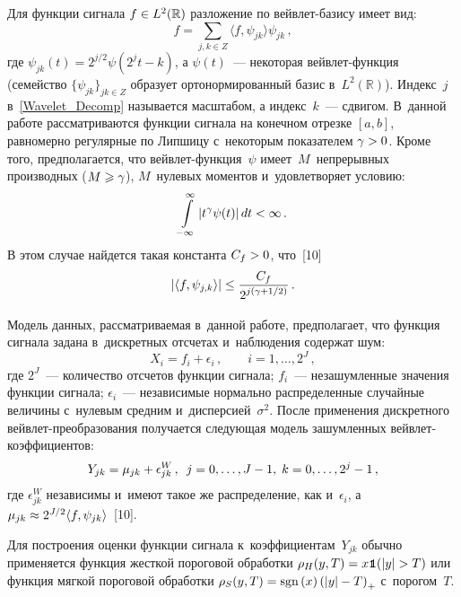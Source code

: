 \begin{multicols}{2}
Для функции сигнала $f\hm\in L^2(\mathbb{R})$ разложение по вейв\-лет-ба\-зи\-су имеет вид:
\begin{equation}
f=\sum\limits_{j,k\in Z}\langle f,\psi_{jk}\rangle\psi_{jk}\,,
\label{Wavelet_Decomp}
\end{equation}
где $\psi_{jk}(t)=2^{j/2}\psi(2^jt-k)$, а $\psi(t)$~--- некоторая 
вейв\-лет-функ\-ция (семейство $\{\psi_{jk}\}_{jk\in Z}$ образует ортонормированный 
базис в~$L^2(\mathbb{R})$). Индекс~$j$ в~\eqref{Wavelet_Decomp} называется 
масштабом, а индекс~$k$~--- сдвигом.\linebreak
В~данной работе рассматриваются функции сигнала на конечном отрезке $[a,b]$, 
равномерно регулярные по Липшицу с~некоторым показателем $\gamma\hm>0$. 
Кроме того, предполагается, что вейв\-лет-функ\-ция~$\psi$ имеет~$M$~непрерывных 
производных ($M\hm\geqslant\gamma$), $M$~нулевых моментов и~удовлетворяет условию:
$$
\int\limits_{-\infty}^{\infty}\left\vert t^{\gamma}\psi(t)\right\vert dt<\infty\,.
$$
В этом случае найдется такая константа $C_f\hm>0$, что~[10]
\begin{equation}
\label{Wavelet_CoeffDecacy}
\left\vert\langle f,\psi_{j,k}\rangle\right\vert\leq\displaystyle\frac{\displaystyle C_f\mathstrut}{\displaystyle 2^{j\left(\gamma+1/2\right)}\mathstrut}\,.
\end{equation}

Модель данных, рассматриваемая в~данной работе, предполагает, что функция сигнала задана в~дискретных отсчетах и~наблюдения содержат шум:
\begin{equation*}
X_i = f_i + \epsilon_i\,, \qquad i = 1, \dots, 2^J\,,
\label{Data_Model}
\end{equation*}
где $2^J$~--- количество отсчетов функции сигнала;
$f_i$~--- незашумленные значения функции сигнала; $\epsilon_i$~--- 
независимые нормально распределенные случайные величины с~нулевым средним 
и~дисперсией~$\sigma^2$.
После применения дискретного вейв\-лет-пре\-об\-ра\-зо\-ва\-ния получается следующая 
модель зашумленных вейв\-лет-ко\-эф\-фи\-ци\-ентов:
\begin{equation*}
Y_{jk}=\mu_{jk}+\epsilon^W_{jk}\,,\enskip j=0,\ldots,J-1,\;k=0,\ldots,2^{j}-1\,,
\end{equation*}
где $\epsilon^W_{jk}$ независимы и~имеют такое же распределение, 
как и~$\epsilon_i$, а $\mu_{jk}\hm\approx 2^{J/2}\langle f,\psi_{jk}\rangle$~[10].

Для построения оценки функции сигнала к~коэффициентам~$Y_{jk}$ 
обычно применяется функция жесткой пороговой обработки 
$\rho_{H}(y,T)\hm=x\Ik(\abs{y}\hm>T)$ или функция мягкой пороговой 
обработки $\rho_{S}(y,T)\hm=\mathrm{sgn}\left(x\right)
\left(\abs{y}-T\right)_{+}$ с~порогом~$T$.


\end{multicols}
